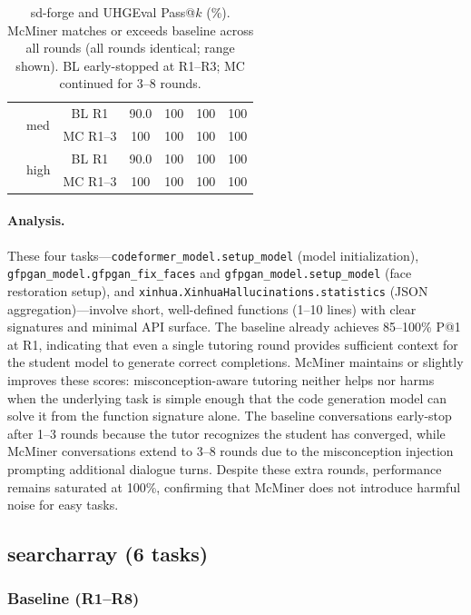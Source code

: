 \documentclass[11pt]{article}
\begin{document}
\begin{table}[h]
\begin{tabular}{llccccc}
    & \multirow{2}{*}{med}  & BL R1 & 90.0 & 100 & 100 & 100 \\
    &                       & MC R1--3 & 100 & 100 & 100 & 100 \\
    & \multirow{2}{*}{high} & BL R1 & 90.0 & 100 & 100 & 100 \\
    &                       & MC R1--3 & 100 & 100 & 100 & 100 \\
    \bottomrule
  \end{tabular}
  \caption{sd-forge and UHGEval Pass@$k$ (\%). McMiner matches or exceeds baseline across all rounds (all rounds identical; range shown). BL early-stopped at R1--R3; MC continued for 3--8 rounds.}
  \label{tab:app-easy}
\end{table}

\paragraph{Analysis.} These four tasks---\texttt{codeformer\_model.setup\_model} (model initialization), \texttt{gfpgan\_model.gfpgan\_fix\_faces} and \texttt{gfpgan\_model.setup\_model} (face restoration setup), and \texttt{xinhua.XinhuaHallucinations.statistics} (JSON aggregation)---involve short, well-defined functions (1--10 lines) with clear signatures and minimal API surface. The baseline already achieves 85--100\% P@1 at R1, indicating that even a single tutoring round provides sufficient context for the student model to generate correct completions. McMiner maintains or slightly improves these scores: misconception-aware tutoring neither helps nor harms when the underlying task is simple enough that the code generation model can solve it from the function signature alone. The baseline conversations early-stop after 1--3 rounds because the tutor recognizes the student has converged, while McMiner conversations extend to 3--8 rounds due to the misconception injection prompting additional dialogue turns. Despite these extra rounds, performance remains saturated at 100\%, confirming that McMiner does not introduce harmful noise for easy tasks.

\subsection{searcharray (6 tasks)}

\subsubsection{Baseline (R1--R8)}
\end{document}
